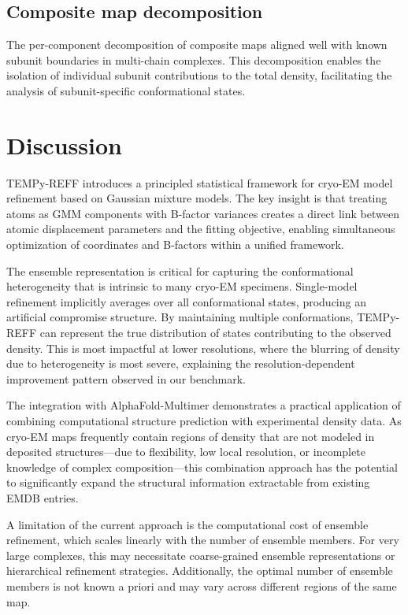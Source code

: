 \documentclass[11pt]{article}
\begin{document}
\subsection{Composite map decomposition}

The per-component decomposition of composite maps aligned well with known subunit boundaries in multi-chain complexes. This decomposition enables the isolation of individual subunit contributions to the total density, facilitating the analysis of subunit-specific conformational states.

\section{Discussion}

TEMPy-REFF introduces a principled statistical framework for cryo-EM model refinement based on Gaussian mixture models. The key insight is that treating atoms as GMM components with B-factor variances creates a direct link between atomic displacement parameters and the fitting objective, enabling simultaneous optimization of coordinates and B-factors within a unified framework.

The ensemble representation is critical for capturing the conformational heterogeneity that is intrinsic to many cryo-EM specimens. Single-model refinement implicitly averages over all conformational states, producing an artificial compromise structure. By maintaining multiple conformations, TEMPy-REFF can represent the true distribution of states contributing to the observed density. This is most impactful at lower resolutions, where the blurring of density due to heterogeneity is most severe, explaining the resolution-dependent improvement pattern observed in our benchmark.

The integration with AlphaFold-Multimer demonstrates a practical application of combining computational structure prediction with experimental density data. As cryo-EM maps frequently contain regions of density that are not modeled in deposited structures---due to flexibility, low local resolution, or incomplete knowledge of complex composition---this combination approach has the potential to significantly expand the structural information extractable from existing EMDB entries.

A limitation of the current approach is the computational cost of ensemble refinement, which scales linearly with the number of ensemble members. For very large complexes, this may necessitate coarse-grained ensemble representations or hierarchical refinement strategies. Additionally, the optimal number of ensemble members is not known a priori and may vary across different regions of the same map.
\end{document}
